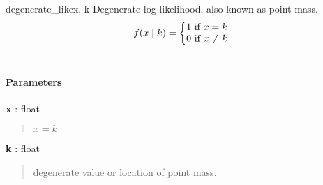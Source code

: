 \hypertarget{pymc.distributions.degenerate_like}{}
\begin{funcdesc}{degenerate\_like}{x, k}
Degenerate log-likelihood, also known as point mass.
\begin{gather}
\begin{split}f(x \mid k) = \left\{ \begin{matrix} 1 \text{ if } x = k \\ 0 \text{ if } x \ne k\end{matrix} \right.\end{split}\notag\\\begin{split}\end{split}\notag
\end{gather}
\paragraph{Parameters}
\begin{paramlist}
\item[] \textbf{x} : float
\begin{quote}

$x = k$
\end{quote}

\item[] \textbf{k} : float
\begin{quote}

degenerate value or location of point mass.
\end{quote}
\end{paramlist}
\end{funcdesc}

